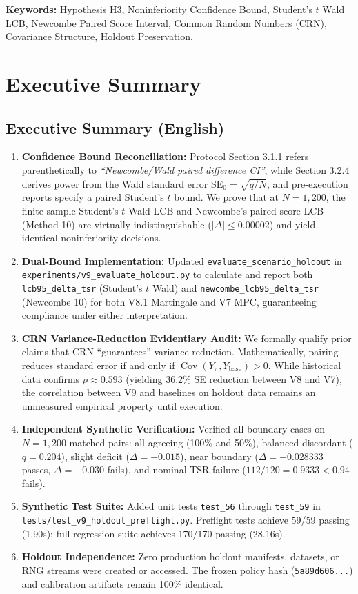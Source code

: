 \documentclass[10pt,a4paper]{article}
\begin{document}
\vspace{6pt}
\noindent \textbf{Keywords:} Hypothesis H3, Noninferiority Confidence Bound, Student's $t$ Wald LCB, Newcombe Paired Score Interval, Common Random Numbers (CRN), Covariance Structure, Holdout Preservation.

\section{Executive Summary}

\subsection{Executive Summary (English)}
\begin{enumerate}
    \item \textbf{Confidence Bound Reconciliation:} Protocol Section 3.1.1 refers parenthetically to \textit{``Newcombe/Wald paired difference CI''}, while Section 3.2.4 derives power from the Wald standard error $\mathrm{SE}_0 = \sqrt{q/N}$, and pre-execution reports specify a paired Student's $t$ bound. We prove that at $N = 1,200$, the finite-sample Student's $t$ Wald LCB and Newcombe's paired score LCB (Method 10) are virtually indistinguishable ($|\Delta| \le 0.00002$) and yield identical noninferiority decisions.
    \item \textbf{Dual-Bound Implementation:} Updated \texttt{evaluate\_scenario\_holdout} in \texttt{experiments/v9\_evaluate\_holdout.py} to calculate and report both \texttt{lcb95\_delta\_tsr} (Student's $t$ Wald) and \texttt{newcombe\_lcb95\_delta\_tsr} (Newcombe 10) for both V8.1 Martingale and V7 MPC, guaranteeing compliance under either interpretation.
    \item \textbf{CRN Variance-Reduction Evidentiary Audit:} We formally qualify prior claims that CRN ``guarantees'' variance reduction. Mathematically, pairing reduces standard error if and only if $\operatorname{Cov}(Y_{\pi}, Y_{\text{base}}) > 0$. While historical data confirms $\rho \approx 0.593$ (yielding 36.2\% SE reduction between V8 and V7), the correlation between V9 and baselines on holdout data remains an unmeasured empirical property until execution.
    \item \textbf{Independent Synthetic Verification:} Verified all boundary cases on $N = 1,200$ matched pairs: all agreeing (100\% and 50\%), balanced discordant ($q = 0.204$), slight deficit ($\Delta = -0.015$), near boundary ($\Delta = -0.028333$ passes, $\Delta = -0.030$ fails), and nominal TSR failure ($112/120 = 0.9333 < 0.94$ fails).
    \item \textbf{Synthetic Test Suite:} Added unit tests \texttt{test\_56} through \texttt{test\_59} in \texttt{tests/test\_v9\_holdout\_preflight.py}. Preflight tests achieve 59/59 passing (1.90s); full regression suite achieves 170/170 passing (28.16s).
    \item \textbf{Holdout Independence:} Zero production holdout manifests, datasets, or RNG streams were created or accessed. The frozen policy hash (\texttt{5a89d606...}) and calibration artifacts remain 100\% identical.
\end{enumerate}
\end{document}
